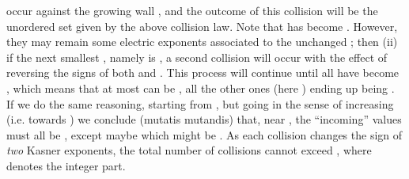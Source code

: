 \documentclass[a4paper,12pt]{article}
\begin{document}
occur against the growing wall \coordHE{}, and the outcome of this collision will be the unordered set 
\coordHE{} given by the above collision law. 
Note that \coordHE{} has become \coordHE{}. However, they may remain some 
\coordHE{} electric exponents associated to the unchanged 
\coordHE{}; then (ii) if the next smallest \coordHE{}, namely \coordHE{} is \coordHE{}, a second collision 
will occur with the effect of reversing the signs of both \coordHE{} and 
\coordHE{}. This process will continue until all \coordHE{} have become \coordHE{}, which means that at most 
\coordHE{} can be \coordHE{}, all the other ones (here 
\coordHE{}) ending up 
being \coordHE{}. If we do the same reasoning, starting from 
\coordHE{}, but going in the sense of increasing \myHighlight{$\overline 
\tau$}\coordHE{} (i.e. towards \coordHE{}) we conclude (mutatis 
mutandis) that, near \coordHE{}, the ``incoming'' values 
\coordHE{} must all be \coordHE{}, except maybe \coordHE{} 
which might be \coordHE{}. As each collision changes the sign of {\it two} 
Kasner exponents, the total number of collisions cannot exceed \myHighlight{$[d/2]$}\coordHE{}, 
where \myHighlight{$[\ldots]$}\coordHE{} denotes the integer part.
\end{document}
